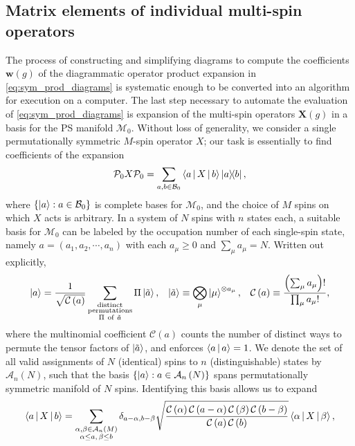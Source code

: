 \documentclass[nofootinbib,notitlepage,11pt]{revtex4-2}
\renewcommand{\t}{\text} %
\newcommand{\f}[2]{\dfrac{#1}{#2}} %
\newcommand{\p}[1]{\left(#1\right)} %
\renewcommand{\set}[1]{\left\{#1\right\}} %
\newcommand{\bk}{\Braket} %
\newcommand{\m}{\bm} %
\newcommand{\1}{\mathds{1}}
\newcommand{\A}{\mathcal{A}}
\newcommand{\B}{\mathcal{B}}
\newcommand{\C}{\mathcal{C}}
\newcommand{\M}{\mathcal{M}}
\renewcommand{\P}{\mathcal{P}}
\begin{document}
\subsection{Matrix elements of individual multi-spin operators}

The process of constructing and simplifying diagrams to compute the
coefficients $\m w\p{g}$ of the diagrammatic operator product
expansion in \eqref{eq:sym_prod_diagrams} is systematic enough to be
converted into an algorithm for execution on a computer.  The last
step necessary to automate the evaluation of
\eqref{eq:sym_prod_diagrams} is expansion of the multi-spin operators
$\m X\p{g}$ in a basis for the PS manifold $\M_0$.  Without loss of
generality, we consider a single permutationally symmetric $M$-spin
operator $X$; our task is essentially to find coefficients of the
expansion
\begin{align}
  \P_0 X \P_0
  = \sum_{a,b\in\B_0} \bk{a|X|b} \op{a}{b},
\end{align}
where $\set{\ket{a}:a\in\B_0}$ is complete bases for $\M_0$, and the
choice of $M$ spins on which $X$ acts is arbitrary.  In a system of
$N$ spins with $n$ states each, a suitable basis for $\M_0$ can be
labeled by the occupation number of each single-spin state, namely
$a=\p{a_1,a_2,\cdots,a_n}$ with each $a_\mu\ge 0$ and
$\sum_\mu a_\mu=N$.  Written out explicitly,
\begin{align}
  \ket{a} = \f1{\sqrt{\C\p{a}}}
  \sum_{\substack{\t{distinct}\\\t{permutations}\\\Pi~\t{of}~\tilde a}}
  \Pi \ket{\tilde a},
  &&
  \ket{\tilde a} \equiv \bigotimes_\mu \ket{\mu}^{\otimes a_\mu},
  &&
  \C\p{a} \equiv \f{\p{\sum_\mu a_\mu}!}{\prod_\mu a_\mu!},
\end{align}
where the multinomial coefficient $\C\p{a}$ counts the number of
distinct ways to permute the tensor factors of $\ket{\tilde a}$, and
enforces $\bk{a|a}=1$.  We denote the set of all valid assignments of
$N$ (identical) spins to $n$ (distinguishable) states by $\A_n\p{N}$,
such that the basis $\set{\ket{a}:a\in\A_n\p{N}}$ spans
permutationally symmetric manifold of $N$ spins.  Identifying this
basis allows us to expand
\begin{align}
  \bk{a|X|b}
  = \sum_{\substack{\alpha,\beta\in\A_n\p{M}\\\alpha\le a,\,\beta\le b}}
  \delta_{a-\alpha,b-\beta}
  \sqrt{\f{\C\p{\alpha}\C\p{a-\alpha}\C\p{\beta}\C\p{b-\beta}}
    {\C\p{a}\C\p{b}}}
  \bk{\alpha|X|\beta},
  \label{eq:multi_body_eval}
\end{align}
\end{document}
